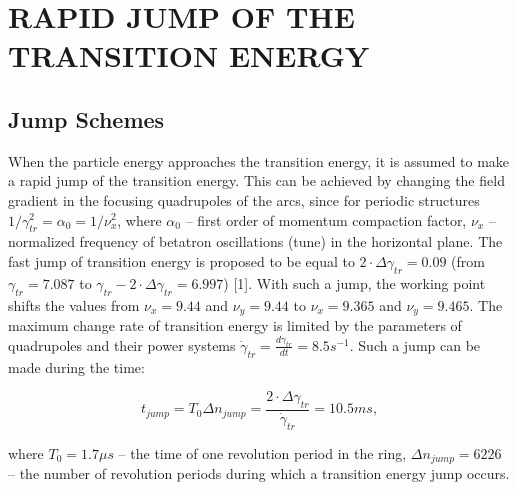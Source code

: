 \documentclass[a4paper,
               keeplastbox,   %
               ]{jacow}
\begin{document}
\section{RAPID JUMP OF THE TRANSITION ENERGY}
\subsection{Jump Schemes}
\par When the particle energy approaches the transition energy, it is assumed to make a rapid jump of the transition energy. This can be achieved by changing the field gradient in the focusing quadrupoles of the arcs, since for periodic structures $1/\gamma_{tr}^{2}=\alpha_{0}=1/\nu_{x}^{2}$, where $\alpha_{0}$ – first order of momentum compaction factor, $\nu_{x}$ – normalized frequency of betatron oscillations (tune) in the horizontal plane. The fast jump of transition energy is proposed to be equal to $2\cdot\Delta\gamma_{tr}=0.09$ (from $\gamma_{tr}=7.087$ to $\gamma_{tr}-2\cdot\Delta\gamma_{tr}=6.997$) [1]. With such a jump, the working point shifts the values from $\nu_{x}=9.44$ and $\nu_{y}=9.44$ to  $\nu_{x}=9.365$ and $\nu_{y}=9.465$. The maximum change rate of transition energy is limited by the parameters of quadrupoles and their power systems $\dot\gamma_{tr}=\frac{d\gamma_{tr}}{dt}=8.5 s^{-1}$. Such a jump can be made during the time:

\begin{equation}\label{eq:jump_time}
t_{jump}=T_{0} \Delta n_{jump}=\frac{2\cdot\Delta\gamma_{tr}}{\dot{\gamma}_{tr}}=10.5 ms,
\end{equation}

\noindent where $T_{0}=1.7 \mu s$ – the time of one revolution period in the ring, $\Delta n_{jump}= 6226$ – the number of revolution periods during which a transition energy jump occurs.
\end{document}
